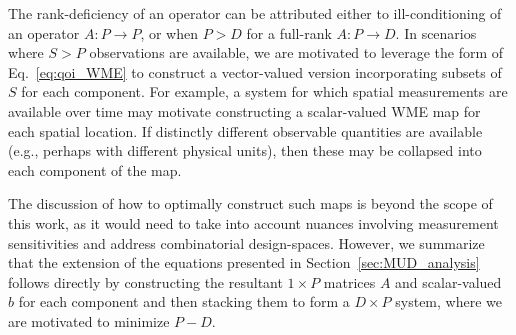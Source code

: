 The rank-deficiency of an operator can be attributed either to ill-conditioning of an operator $A:P\to P$, or when $P>D$ for a full-rank $A:P\to D$.
In scenarios where $S>P$ observations are available, we are motivated to leverage the form of Eq.~\eqref{eq:qoi_WME} to construct a vector-valued version incorporating subsets of $S$ for each component.
For example, a system for which spatial measurements are available over time may motivate constructing a scalar-valued WME map for each spatial location.
If distinctly different observable quantities are available (e.g., perhaps with different physical units), then these may be collapsed into each component of the map.

The discussion of how to optimally construct such maps is beyond the scope of this work, as it would need to take into account nuances involving measurement sensitivities and address combinatorial design-spaces.
However, we summarize that the extension of the equations presented in Section~\ref{sec:MUD_analysis} follows directly by constructing the resultant $1\times P$ matrices $A$ and scalar-valued $b$ for each component and then stacking them to form a $D\times P$ system, where we are motivated to minimize $P-D$.


